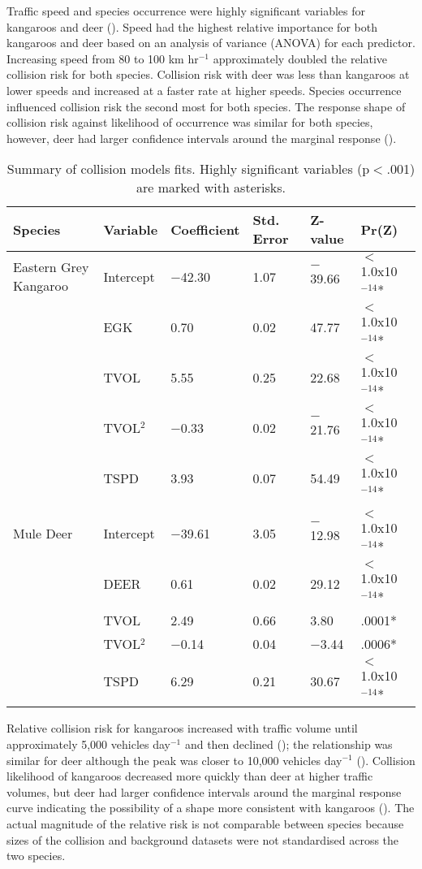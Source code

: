 Traffic speed and species occurrence were highly significant variables for kangaroos and deer (). Speed had the highest relative importance for both kangaroos and deer based on an analysis of variance (ANOVA) for each predictor. Increasing speed from 80 to 100 km hr$^{-1}$ approximately doubled the relative collision risk for both species.  Collision risk with deer was less than kangaroos at lower speeds and increased at a faster rate at higher speeds. Species occurrence influenced collision risk the second most for both species.  The response shape of collision risk against likelihood of occurrence was similar for both species, however, deer had larger confidence intervals around the marginal response ().

\begin{table}[!t]
\caption[Summary of collision models for kangaroos and deer]{Summary of collision models fits.  Highly significant variables (p$<$.001) are marked with asterisks.}
\centering
\begin{tabularx}{0.9\textwidth}{llllll} \toprule
Species					&Variable		&Coefficient	&Std. Error		&Z-value	&Pr(Z) \\ \midrule
Eastern Grey Kangaroo	&Intercept		&$-$42.30			&1.07		&$-$39.66	&$<$1.0x10$^{-14}$* \\
						&EGK			&0.70			&0.02			&47.77		&$<$1.0x10$^{-14}$* \\
						&TVOL			&5.55			&0.25			&22.68		&$<$1.0x10$^{-14}$* \\
						&TVOL$^2$		&$-$0.33		&0.02			&$-$21.76	&$<$1.0x10$^{-14}$* \\
						&TSPD			&3.93			&0.07			&54.49		&$<$1.0x10$^{-14}$* \\
&&&&& \\
Mule Deer				&Intercept		&$-$39.61		&3.05			&$-$12.98	&$<$1.0x10$^{-14}$* \\
						&DEER			&0.61			&0.02			&29.12		&$<$1.0x10$^{-14}$* \\
						&TVOL			&2.49			&0.66			&3.80		&.0001* \\
						&TVOL$^2$		&$-$0.14		&0.04			&$-$3.44	&.0006* \\
						&TSPD			&6.29			&0.21			&30.67		&$<$1.0x10$^{-14}$* \\
\bottomrule
\end{tabularx}
\label{cal_model_fits}
\end{table}

Relative collision risk  for kangaroos increased with traffic volume until approximately 5,000 vehicles day$^{-1}$ and then declined (); the relationship was similar for deer although the peak was closer to 10,000 vehicles day$^{-1}$ (). Collision likelihood of kangaroos decreased more quickly than deer at higher traffic volumes, but deer had larger confidence intervals around the marginal response curve indicating the possibility of a shape more consistent with kangaroos (). The actual magnitude of the relative risk is not comparable between species because sizes of the collision and background datasets were not standardised across the two species.

